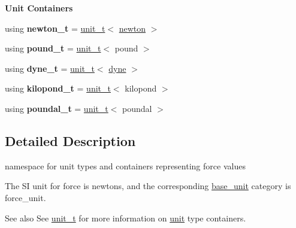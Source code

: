 \begin{Indent}{\bf Unit Containers}\par
{\em \label{namespaceunits_1_1force_forceContainers}%
\hypertarget{namespaceunits_1_1force_forceContainers}{}%
}\begin{DoxyCompactItemize}
\item 
\hypertarget{namespaceunits_1_1force_a1a19ee406f68b9aedb1def970ca6bdfb}{}using {\bfseries newton\+\_\+t} = \hyperlink{classunits_1_1unit__t}{unit\+\_\+t}$<$ \hyperlink{structunits_1_1unit}{newton} $>$\label{namespaceunits_1_1force_a1a19ee406f68b9aedb1def970ca6bdfb}

\item 
\hypertarget{namespaceunits_1_1force_a0f1dae626d614f9c07426cdac760c96d}{}using {\bfseries pound\+\_\+t} = \hyperlink{classunits_1_1unit__t}{unit\+\_\+t}$<$ pound $>$\label{namespaceunits_1_1force_a0f1dae626d614f9c07426cdac760c96d}

\item 
\hypertarget{namespaceunits_1_1force_a4e817f953b2a1436841bccaf815f737a}{}using {\bfseries dyne\+\_\+t} = \hyperlink{classunits_1_1unit__t}{unit\+\_\+t}$<$ \hyperlink{structunits_1_1unit}{dyne} $>$\label{namespaceunits_1_1force_a4e817f953b2a1436841bccaf815f737a}

\item 
\hypertarget{namespaceunits_1_1force_a8d2176df1d41fc6470b3553b6248ca55}{}using {\bfseries kilopond\+\_\+t} = \hyperlink{classunits_1_1unit__t}{unit\+\_\+t}$<$ kilopond $>$\label{namespaceunits_1_1force_a8d2176df1d41fc6470b3553b6248ca55}

\item 
\hypertarget{namespaceunits_1_1force_a3baf5cdf43cb5da96466c0330dfa882f}{}using {\bfseries poundal\+\_\+t} = \hyperlink{classunits_1_1unit__t}{unit\+\_\+t}$<$ poundal $>$\label{namespaceunits_1_1force_a3baf5cdf43cb5da96466c0330dfa882f}

\end{DoxyCompactItemize}
\end{Indent}


\subsection{Detailed Description}
namespace for unit types and containers representing force values 

The S\+I unit for force is {\ttfamily newtons}, and the corresponding {\ttfamily \hyperlink{structunits_1_1base__unit}{base\+\_\+unit}} category is {\ttfamily force\+\_\+unit}. \begin{DoxySeeAlso}{See also}
See \hyperlink{classunits_1_1unit__t}{unit\+\_\+t} for more information on \hyperlink{structunits_1_1unit}{unit} type containers. 
\end{DoxySeeAlso}

